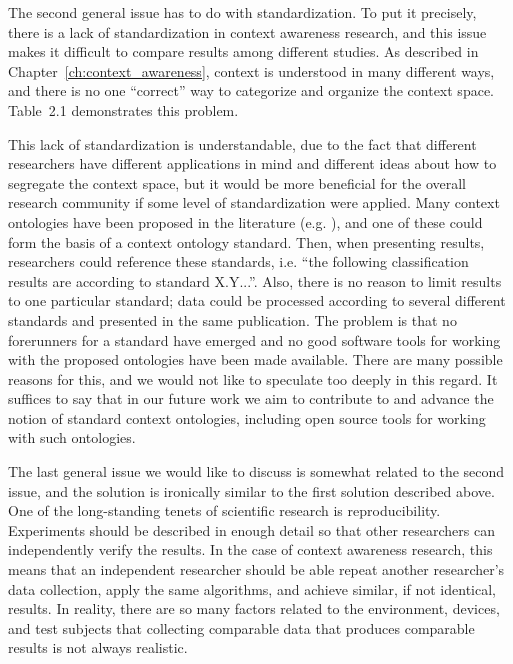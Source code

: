 The second general issue has to do with standardization. To put it precisely, there is a lack of standardization in context awareness research, and this issue makes it difficult to compare results among different studies. As described in Chapter~\ref{ch:context_awareness}, context is understood in many different ways, and there is no one ``correct'' way to categorize and organize the context space. Table~2.1 demonstrates this problem.

This lack of standardization is understandable, due to the fact that different researchers have different applications in mind and different ideas about how to segregate the context space, but it would be more beneficial for the overall research community if some level of standardization were applied. Many context ontologies have been proposed in the literature (e.g. \cite{guermah2014ontology} \cite{chen2003ontology} \cite{wang2004ontology} \cite{gu2004ontology} \cite{strang2003cool}), and one of these could form the basis of a context ontology standard. Then, when presenting results, researchers could reference these standards, i.e. ``the following classification results are according to standard X.Y...''. Also, there is no reason to limit results to one particular standard; data could be processed according to several different standards and presented in the same publication. The problem is that no forerunners for a standard have emerged and no good software tools for working with the proposed ontologies have been made available. There are many possible reasons for this, and we would not like to speculate too deeply in this regard. It suffices to say that in our future work we aim to contribute to and advance the notion of standard context ontologies, including open source tools for working with such ontologies.
%


The last general issue we would like to discuss is somewhat related to the second issue, and the solution is ironically similar to the first solution described above. One of the long-standing tenets of scientific research is reproducibility. Experiments should be described in enough detail so that other researchers can independently verify the results. In the case of context awareness research, this means that an independent researcher should be able repeat another researcher's data collection, apply the same algorithms, and achieve similar, if not identical, results. In reality, there are so many factors related to the environment, devices, and test subjects that collecting comparable data that produces comparable results is not always realistic.

